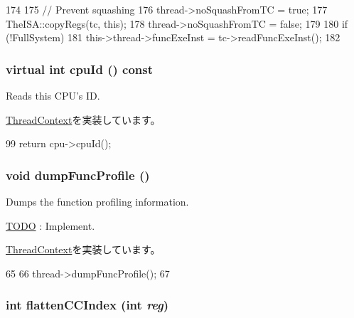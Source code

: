 \begin{DoxyCode}
174 {
175     // Prevent squashing
176     thread->noSquashFromTC = true;
177     TheISA::copyRegs(tc, this);
178     thread->noSquashFromTC = false;
179 
180     if (!FullSystem)
181         this->thread->funcExeInst = tc->readFuncExeInst();
182 }
\end{DoxyCode}
\hypertarget{classO3ThreadContext_a380902de24674abc2125ffb1adc81528}{
\subsubsection[{cpuId}]{\setlength{\rightskip}{0pt plus 5cm}virtual int cpuId () const}}
\label{classO3ThreadContext_a380902de24674abc2125ffb1adc81528}
Reads this CPU's ID. 

\hyperlink{classThreadContext_a7272bc1f752a9f60ab0358a09cc96f97}{ThreadContext}を実装しています。


\begin{DoxyCode}
99 { return cpu->cpuId(); }
\end{DoxyCode}
\hypertarget{classO3ThreadContext_a13fa12d1779a94a1e0b968946a1367c7}{
\subsubsection[{dumpFuncProfile}]{\setlength{\rightskip}{0pt plus 5cm}void dumpFuncProfile ()}}
\label{classO3ThreadContext_a13fa12d1779a94a1e0b968946a1367c7}
Dumps the function profiling information. \begin{Desc}
\item[\hyperlink{todo__todo000040}{TODO}]: Implement. \end{Desc}


\hyperlink{classThreadContext_ae3f0b63a85470c17e675083487febead}{ThreadContext}を実装しています。


\begin{DoxyCode}
65 {
66     thread->dumpFuncProfile();
67 }
\end{DoxyCode}
\hypertarget{classO3ThreadContext_ac33d74353e36a595ec48962cd0446320}{
\subsubsection[{flattenCCIndex}]{\setlength{\rightskip}{0pt plus 5cm}int flattenCCIndex (int {\em reg})}}
\label{classO3ThreadContext_ac33d74353e36a595ec48962cd0446320}


